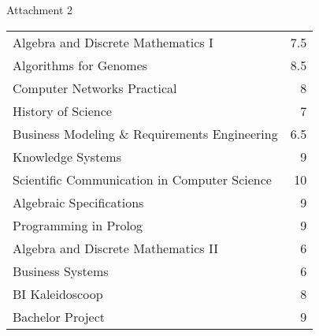 \documentclass[a4paper,11pt]{article}
\begin{document}
\begin{cv}{}
\begin{cvlist}{Attachment 2}
\begin{tabular}{p{23em}d}
    Algebra and Discrete Mathematics I & 7.5\\
    Algorithms for Genomes & 8.5\\
    Computer Networks Practical & 8\\
    History of Science & 7\\
    Business Modeling \& Requirements Engineering & 6.5\\
    Knowledge Systems & 9\\
    Scientific Communication in Computer Science & 10\\
    Algebraic Specifications & 9\\
    Programming in Prolog & 9\\
    Algebra and Discrete Mathematics II & 6\\
    Business Systems & 6\\
    BI Kaleidoscoop & 8\\
    Bachelor Project & 9
\end{tabular}
\end{cvlist}


\end{cv}
\end{document}
